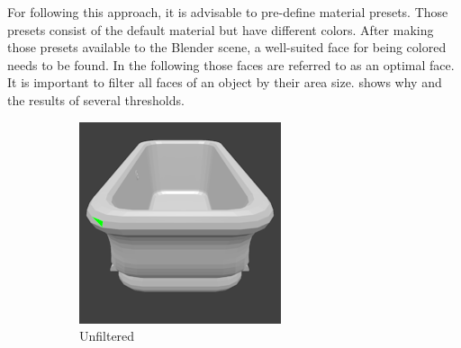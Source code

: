 For following this approach, it is advisable to pre-define material presets.
Those presets consist of the default material but have different colors.
After making those presets available to the Blender scene, a well-suited face for being colored needs to be found.
In the following those faces are referred to as an optimal face.
It is important to filter all faces of an object by their area size.
 shows why and the results of several thresholds.
\begin{figure}
	\centering
	\begin{subfigure}{.32\textwidth}
		\centering
		\includegraphics[width=\textwidth]{images/face_area_unfiltered.png}
		\caption{Unfiltered}
		\label{fig:face-area-unfiltered}
	\end{subfigure}
	\begin{subfigure}{.32\textwidth}
		\centering

\end{subfigure}
\end{figure}
